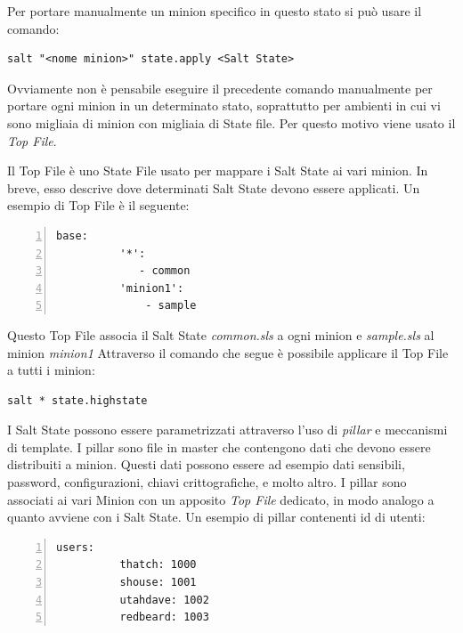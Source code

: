 Per portare manualmente un minion specifico in questo stato si può usare il comando:
\begin{center}
    \begin{BVerbatim}
salt "<nome minion>" state.apply <Salt State> 
    \end{BVerbatim}
\end{center}

Ovviamente non è pensabile eseguire il precedente comando manualmente per portare ogni minion in un determinato stato, soprattutto per ambienti in cui vi sono migliaia di minion con migliaia di State file. Per questo motivo viene usato il \textit{Top File}.

Il Top File è uno State File usato per  mappare i Salt State ai vari minion. In breve, esso descrive dove determinati Salt State devono essere applicati.
Un esempio di Top File è il seguente:
    \begin{Verbatim}[numbers=left, frame=single, fontsize=\small]
        base:
          '*':
             - common
          'minion1':
              - sample
    \end{Verbatim} 
Questo Top File associa il Salt State \textit{common.sls} a ogni minion e \textit{sample.sls} al minion \textit{minion1}
Attraverso il comando che segue è possibile applicare il Top File a tutti i minion:
\begin{center}
    \begin{BVerbatim}
salt * state.highstate
    \end{BVerbatim}
\end{center}

I Salt State possono essere parametrizzati attraverso l'uso di  \textit{pillar} e meccanismi di template.
I pillar sono file in master che contengono dati che devono essere distribuiti a minion. Questi dati possono essere ad esempio dati sensibili, password, configurazioni, chiavi crittografiche, e molto altro.
I pillar sono associati ai vari Minion con un apposito \textit{Top File} dedicato, in modo analogo a quanto avviene con i Salt State.
Un esempio di pillar contenenti id di utenti:
    \begin{Verbatim}[numbers=left, frame=single, fontsize=\small]
        users:
          thatch: 1000
          shouse: 1001
          utahdave: 1002
          redbeard: 1003
    \end{Verbatim}

